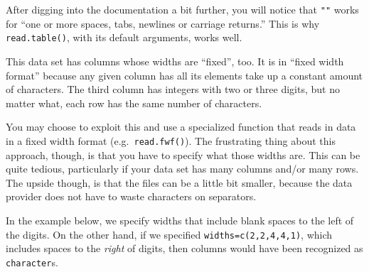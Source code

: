 \documentclass[
  12pt,
  krantz2]{krantz}
\makeatletter
\newenvironment{Shaded}{\begin{snugshade}}{\end{snugshade}}
\newcommand{\DocumentationTok}[1]{\textcolor[rgb]{0.37,0.37,0.37}{\textbf{\textit{#1}}}}
\newcommand{\FunctionTok}[1]{\textcolor[rgb]{0,0,0}{#1}}
\newcommand{\NormalTok}[1]{#1}
\newcommand{\OtherTok}[1]{\textcolor[rgb]{0.37,0.37,0.37}{#1}}
\newcommand{\StringTok}[1]{\textcolor[rgb]{0.5,0.5,0.5}{#1}}
\newenvironment{kframe}{%
\medskip{}
\setlength{\fboxsep}{.8em}
 \def\at@end@of@kframe{}%
 \ifinner\ifhmode%
  \def\at@end@of@kframe{\end{minipage}}%
  \begin{minipage}{\columnwidth}%
 \fi\fi%
 \def\FrameCommand##1{\hskip\@totalleftmargin \hskip-\fboxsep
 \colorbox{shadecolor}{##1}\hskip-\fboxsep
     \hskip-\linewidth \hskip-\@totalleftmargin \hskip\columnwidth}%
 \MakeFramed {\advance\hsize-\width
   \@totalleftmargin\z@ \linewidth\hsize
   \@setminipage}}%
 {\par\unskip\endMakeFramed%
 \at@end@of@kframe}
\renewenvironment{Shaded}{\begin{kframe}}{\end{kframe}}
\makeatother
\begin{document}
After digging into the documentation a bit further, you will notice that \texttt{""} works for ``one or more spaces, tabs, newlines or carriage returns.'' This is why \texttt{read.table()}, with its default arguments, works well.

\begin{Shaded}
\end{Shaded}

This data set has columns whose widths are ``fixed'', too. It is in ``fixed width format'' because any given column has all its elements take up a constant amount of characters. The third column has integers with two or three digits, but no matter what, each row has the same number of characters.

You may choose to exploit this and use a specialized function that reads in data in a fixed width format (e.g.~\texttt{read.fwf()}). The frustrating thing about this approach, though, is that you have to specify what those widths are. This can be quite tedious, particularly if your data set has many columns and/or many rows. The upside though, is that the files can be a little bit smaller, because the data provider does not have to waste characters on separators.

In the example below, we specify widths that include blank spaces to the left of the digits. On the other hand, if we specified \texttt{widths=c(2,2,4,4,1)}, which includes spaces to the \emph{right} of digits, then columns would have been recognized as \texttt{character}s.
\end{document}
